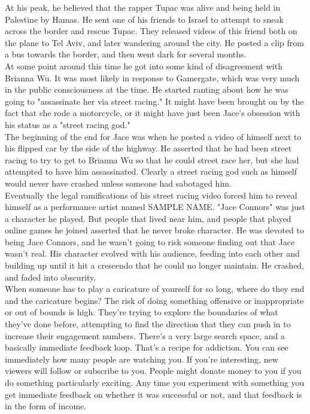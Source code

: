\documentclass{article}
\begin{document}
At his peak, he believed that the rapper Tupac was alive and being held in Palestine by Hamas. He sent one of his friends to Israel to attempt to sneak across the border and rescue Tupac. They released videos of this friend both on the plane to Tel Aviv, and later wandering around the city. He posted a clip from a bus towards the border, and then went dark for several months.\\

At some point around this time he got into some kind of disagreement with Brianna Wu. It was most likely in response to Gamergate, which was very much in the public consciousness at the time. He started ranting about how he was going to "assassinate her via street racing." It might have been brought on by the fact that she rode a motorcycle, or it might have just been Jace's obsession with his status as a "street racing god."\\

The beginning of the end for Jace was when he posted a video of himself next to his flipped car by the side of the highway. He asserted that he had been street racing to try to get to Brianna Wu so that he could street race her, but she had attempted to have him assassinated. Clearly a street racing god such as himself would never have crashed unless someone had sabotaged him.\\

Eventually the legal ramifications of his street racing video forced him to reveal himself as a performance artist named SAMPLE NAME. "Jace Connors" was just a character he played. But people that lived near him, and people that played online games he joined asserted that he never broke character. He was devoted to being Jace Connors, and he wasn't going to risk someone finding out that Jace wasn't real. His character evolved with his audience, feeding into each other and building up until it hit a crescendo that he could no longer maintain. He crashed, and faded into obscurity.\\

When someone has to play a caricature of yourself for so long, where do they end and the caricature begins? The risk of doing something offensive or inappropriate or out of bounds is high. They're trying to explore the boundaries of what they've done before, attempting to find the direction that they can push in to increase their engagement numbers. There's a very large search space, and a basically immediate feedback loop. That's a recipe for addiction. You can see immediately how many people are watching you. If you're interesting, new viewers will follow or subscribe to you. People might donate money to you if you do something particularly exciting. Any time you experiment with something you get immediate feedback on whether it was successful or not, and that feedback is in the form of income.\\
\end{document}
